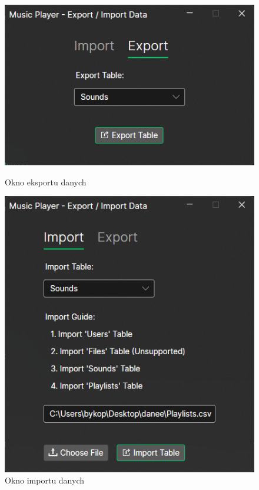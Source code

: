 \begin{figure}[h!]
  \centering
  \begin{minipage}{.53\textwidth}
    \centering
    \includegraphics[width=.9\linewidth]{figures/export.png}
    \caption{{\footnotesize Okno eksportu danych}}
  \end{minipage}%
  \begin{minipage}{.55\textwidth}
    \centering
    \includegraphics[width=.9\linewidth]{figures/import.png}
    \caption{{\footnotesize Okno importu danych}}
  \end{minipage}
\end{figure}

